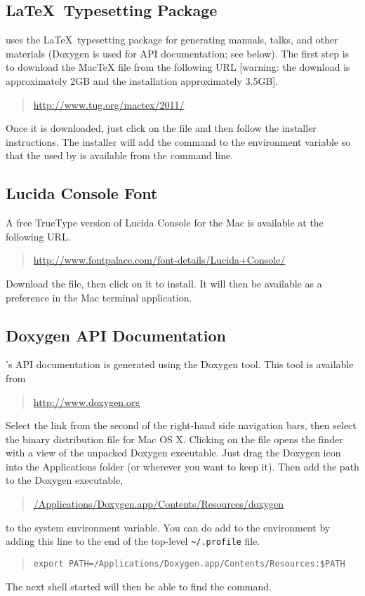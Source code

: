 \subsection{\LaTeX\ Typesetting Package}

\Stan uses the \LaTeX\ typesetting package for generating manuals,
talks, and other materials (Doxygen is used for API documentation; see
below).  The first step is to download the MacTeX  file
from the following URL [warning: the download is approximately 2GB and
the installation approximately 3.5GB].
%
\begin{quote}
\url{http://www.tug.org/mactex/2011/}
\end{quote}
%
Once it is downloaded, just click on the  file and then
follow the installer instructions.  The installer will add the command
to the  environment variable so that the 
used by \Stan is available from the command line.


\subsection{Lucida Console Font}

A free TrueType version of Lucida Console for the Mac is available
at the following URL.
%
\begin{quote}
\url{http://www.fontpalace.com/font-details/Lucida+Console/}
\end{quote}
%
Download the  file, then click on it to install.  It
will then be available as a preference in the Mac terminal application.

\subsection{Doxygen API Documentation}

\Stan's API documentation is generated using the Doxygen tool.   This
tool is available from
%
\begin{quote}
\url{http://www.doxygen.org}
\end{quote}
%
Select the  link from the second of the right-hand side
navigation bars, then select the binary distribution  file
for Mac OS X.  Clicking on the  file opens the finder with
a view of the unpacked Doxygen executable.  Just drag the Doxygen icon
into the Applications folder (or wherever you want to keep it).  Then
add the path to the Doxygen executable, 
%
\begin{quote}
\url{/Applications/Doxygen.app/Contents/Resources/doxygen}
\end{quote}
%
to the system  environment variable.  You can do add to the
 environment by adding this line to the end of the
top-level \verb|~/.profile| file.  
%
\begin{quote}
\begin{Verbatim}[fontsize=\small]
export PATH=/Applications/Doxygen.app/Contents/Resources:$PATH
\end{Verbatim}
\end{quote}
%
The next shell started will then be able to find the  command.


